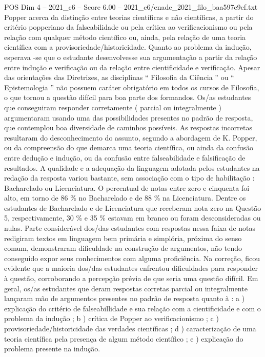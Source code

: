 \begin{textsample}{POS Dim 4 – 2021\_c6 – Score 6.00 – 2021\_c6/enade\_2021\_filo\_baa597e9cf.txt}
Popper acerca da distinção entre teorias científicas e não científicas, a partir do critério popperiano da falseabilidade ou pela crítica ao verificacionismo ou pela relação com qualquer método científico ou, ainda, pela relação de uma teoria científica com a provisoriedade/historicidade.
Quanto ao problema da indução, esperava -se que o estudante desenvolvesse sua argumentação a partir da relação entre indução e verificação ou da relação entre cientificidade e verificação.
Apesar das orientações das Diretrizes, as disciplinas “ Filosofia da Ciência ” ou “ Epistemologia ” não possuem caráter obrigatório em todos os cursos de Filosofia, o que tornou a questão difícil para boa parte dos formandos.
Os/as estudantes que conseguiram responder corretamente ( parcial ou integralmente ) argumentaram usando uma das possibilidades presentes no padrão de resposta, que contemplou boa diversidade de caminhos possíveis.
As respostas incorretas resultaram do desconhecimento do assunto, segundo a abordagem de K.
Popper, ou da compreensão do que demarca uma teoria científica, ou ainda da confusão entre dedução e indução, ou da confusão entre falseabilidade e falsificação de resultados.
A qualidade e a adequação da linguagem adotada pelos estudantes na redação da resposta variou bastante, sem associação com o tipo de habilitação : Bacharelado ou Licenciatura.
O percentual de notas entre zero e cinquenta foi alto, em torno de 86 \% no Bacharelado e de 88 \% na Licenciatura.
Dentre os estudantes de Bacharelado e de Licenciatura que receberam nota zero na Questão 5, respectivamente, 30 \% e 35 \% estavam em branco ou foram desconsideradas ou nulas.
Parte considerável dos/das estudantes com respostas nessa faixa de notas redigiram textos em linguagem bem primária e simplória, próxima do senso comum, demonstraram dificuldade na construção de argumentos, não tendo conseguido expor seus conhecimentos com alguma proficiência.
Na correção, ficou evidente que a maioria dos/das estudantes enfrentou dificuldades para responder à questão, corroborando a percepção prévia de que seria uma questão difícil.
Em geral, os/as estudantes que deram respostas corretas parcial ou integralmente lançaram mão de argumentos presentes no padrão de resposta quanto à : a ) explicação do critério de falseabillidade e sua relação com a cientificidade e com o problema da indução ; b ) crítica de Popper ao verificacionismo ; c ) provisoriedade/historicidade das verdades científicas ; d ) caracterização de uma teoria científica pela presença de algum método científico ; e ) explicação do problema presente na indução.

\end{textsample}
